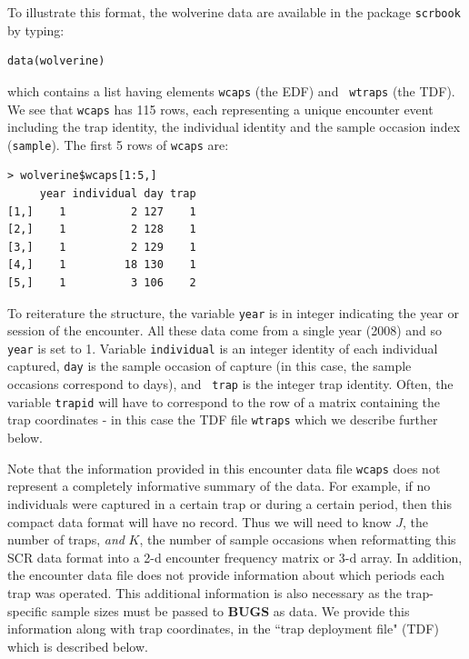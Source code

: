 {To illustrate this format, the wolverine data are available in the
package \mbox{\tt scrbook} by typing:
\begin{verbatim}
data(wolverine)
\end{verbatim}
which contains a list having elements \mbox{\tt wcaps} (the EDF) and \mbox{\tt
  wtraps} (the TDF). 
We see that  \mbox{\tt wcaps} has 
 115 rows, each representing a unique encounter event including the
trap identity, the individual identity and the sample occasion index
(\mbox{\tt sample}).  The first 5 rows of \mbox{\tt wcaps} are:
{\small
\begin{verbatim}
> wolverine$wcaps[1:5,]
     year individual day trap
[1,]    1          2 127    1
[2,]    1          2 128    1
[3,]    1          2 129    1
[4,]    1         18 130    1
[5,]    1          3 106    2
\end{verbatim}
}
To reiterature the structure, the variable \mbox{\tt year} is in
integer indicating the year or session of the encounter. All these
data come from a single year (2008) and so \mbox{\tt year} is set to
1. Variable \mbox{\tt individual} is an integer identity of each
individual captured, \mbox{\tt day} is the sample occasion of capture
(in this case, the sample occasions correspond to days), and \mbox{\tt
  trap} is the integer trap identity. 
Often, the variable \mbox{\tt trapid} will have to
correspond to the row of a matrix containing the trap coordinates - in
this case the TDF file \mbox{\tt wtraps} which we describe further below.

Note that the information provided in this encounter data file
\mbox{\tt wcaps} does not represent a completely informative summary
of the data. For example, if no individuals were captured in a certain
trap or during a certain period, then this compact data format will
have no record. Thus we will need to know $J$, the number of traps,
{\it and} $K$, the number of sample occasions
when reformatting this SCR data format into a 2-d
encounter frequency matrix or 3-d array. In addition, the encounter
data file does not provide information about which periods each trap
was operated. This additional information is also necessary as the
trap-specific sample sizes must be passed to {\bf BUGS} as data. We
provide this information along with trap
coordinates, in the ``trap deployment file" (TDF)
 which is described below.

}
